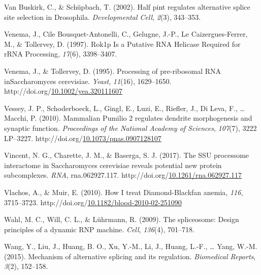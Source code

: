\documentclass[12pt,oneside]{reedthesis}
\newlength{\cslhangindent}
\newenvironment{CSLReferences}[2] %
 {%
  \setlength{\parindent}{0pt}
  \ifodd #1 \everypar{\setlength{\hangindent}{\cslhangindent}}\ignorespaces\fi
  \ifnum #2 > 0
  \setlength{\parskip}{#2\baselineskip}
  \fi
 }%
 {}
\begin{document}
\begin{CSLReferences}{1}{0}
\leavevmode{}%
Van Buskirk, C., \& Schüpbach, T. (2002). Half pint regulates alternative splice site selection in {Drosophila}. \emph{Developmental Cell}, \emph{2}(3), 343--353.

\leavevmode{}%
Venema, J., Cile Bousquet-Antonelli, C., Gelugne, J.-P., Le Caizergues-Ferrer, M., \& Tollervey, D. (1997). Rok1p {Is} a {Putative RNA Helicase Required} for {rRNA Processing}, \emph{17}(6), 3398--3407.

\leavevmode{}%
Venema, J., \& Tollervey, D. (1995). Processing of pre-ribosomal {RNA inSaccharomyces} cerevisiae. \emph{Yeast}, \emph{11}(16), 1629--1650. http://doi.org/\href{https://doi.org/10.1002/yea.320111607}{10.1002/yea.320111607}

\leavevmode{}%
Vessey, J. P., Schoderboeck, L., Gingl, E., Luzi, E., Riefler, J., Di Leva, F., \ldots{} Macchi, P. (2010). Mammalian {Pumilio} 2 regulates dendrite morphogenesis and synaptic function. \emph{Proceedings of the National Academy of Sciences}, \emph{107}(7), 3222 LP--3227. http://doi.org/\href{https://doi.org/10.1073/pnas.0907128107}{10.1073/pnas.0907128107}

\leavevmode{}%
Vincent, N. G., Charette, J. M., \& Baserga, S. J. (2017). The {SSU} processome interactome in {Saccharomyces} cerevisiae reveals potential new protein subcomplexes. \emph{RNA}, rna.062927.117. http://doi.org/\href{https://doi.org/10.1261/rna.062927.117}{10.1261/rna.062927.117}

\leavevmode{}%
Vlachos, A., \& Muir, E. (2010). How {I} treat {Diamond}-{Blackfan} anemia, \emph{116}, 3715--3723. http://doi.org/\href{https://doi.org/10.1182/blood-2010-02-251090}{10.1182/blood-2010-02-251090}

\leavevmode{}%
Wahl, M. C., Will, C. L., \& Lührmann, R. (2009). The spliceosome: Design principles of a dynamic {RNP} machine. \emph{Cell}, \emph{136}(4), 701--718.

\leavevmode{}%
Wang, Y., Liu, J., Huang, B. O., Xu, Y.-M., Li, J., Huang, L.-F., \ldots{} Yang, W.-M. (2015). Mechanism of alternative splicing and its regulation. \emph{Biomedical Reports}, \emph{3}(2), 152--158.


\end{CSLReferences}
\end{document}
